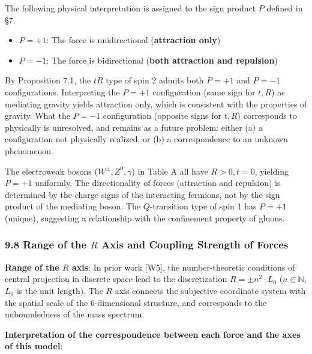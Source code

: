 \documentclass[
  a4paper,11pt]{article}
\providecommand{\tightlist}{%
  \setlength{\itemsep}{0pt}\setlength{\parskip}{0pt}}
\theoremstyle{definition}
\theoremstyle{remark}
\begin{document}
The following physical interpretation is assigned to the sign product
\(P\) defined in §7.

\begin{itemize}
\tightlist
\item
  \(P = +1\): The force is unidirectional (\textbf{attraction only})
\item
  \(P = -1\): The force is bidirectional (\textbf{both attraction and
  repulsion})
\end{itemize}

By Proposition 7.1, the \(tR\) type of spin 2 admits both \(P = +1\) and
\(P = -1\) configurations. Interpreting the \(P = +1\) configuration
(same sign for \(t, R\)) as mediating gravity yields attraction only,
which is consistent with the properties of gravity. What the \(P = -1\)
configuration (opposite signs for \(t, R\)) corresponds to physically is
unresolved, and remains as a future problem: either (a) a configuration
not physically realized, or (b) a correspondence to an unknown
phenomenon.

The electroweak bosons (\(W^\pm, Z^0, \gamma\)) in Table A all have
\(R > 0, t = 0\), yielding \(P = +1\) uniformly. The directionality of
forces (attraction and repulsion) is determined by the charge signs of
the interacting fermions, not by the sign product of the mediating
boson. The \(Q\)-transition type of spin 1 has \(P = +1\) (unique),
suggesting a relationship with the confinement property of gluons.

\subsubsection{\texorpdfstring{9.8 Range of the \(R\) Axis and Coupling
Strength of
Forces}{9.8 Range of the R Axis and Coupling Strength of Forces}}\label{range-of-the-r-axis-and-coupling-strength-of-forces}

\textbf{Range of the \(R\) axis}: In prior work {[}W5{]}, the
number-theoretic conditions of central projection in discrete space lead
to the discretization \(R = \pm n^2 \cdot L_0\) (\(n \in \mathbb{N}\),
\(L_0\) is the unit length). The \(R\) axis connects the subjective
coordinate system with the spatial scale of the 6-dimensional structure,
and corresponds to the unboundedness of the mass spectrum.

\textbf{Interpretation of the correspondence between each force and the
axes of this model}:
\end{document}
